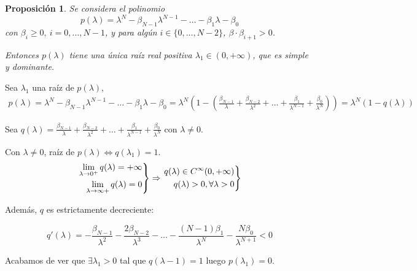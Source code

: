 \documentclass[11pt, a4paper]{article}
\makeatletter
\newif\IfInSansMode
\let\oldsf\sffamily
\renewcommand*{\sffamily}{\oldsf\mathversion{sans}\InSansModetrue}
\let\oldnorm\normalfont
\renewcommand*{\normalfont}{\oldnorm\InSansModefalse\mathversion{normal}}
\renewenvironment{proof}[1][\proofname] {\vspace{-15pt}\par\pushQED{\qed}\normalfont\topsep6\p@\@plus6\p@\relax\trivlist\item[\hskip\labelsep\it#1\@addpunct{.}]\ignorespaces}{\popQED\endtrivlist\@endpefalse}
\numberwithin{equation}{section}
\renewenvironment{proof}[1][\proofname] {\par\pushQED{\qed}\normalfont\topsep6\p@\@plus6\p@\relax\trivlist\item[\hskip\labelsep\itshape\sffamily#1\@addpunct{.}]\ignorespaces}{\popQED\endtrivlist\@endpefalse}
\theoremstyle{theorem-style}
\newtheorem{nprop}{Proposición}[section]
\theoremstyle{definition-style}
\theoremstyle{remark-style}
\theoremstyle{example-style}
\newenvironment{rcases}
  {\left.\begin{aligned}}
  {\end{aligned}\right\rbrace}
\makeatother
\begin{document}
     \begin{nprop}
        Se considera el polinomio $$p(\lambda) = \lambda^{N} - \beta_{N-1}\lambda^{N-1} - \hdots - \beta_1\lambda - \beta_0$$ con $\beta_i \geq 0, \ i = 0, \hdots, N -1$, y para algún $i \in \{ 0, \hdots, N -2 \}$, $\beta \cdot \beta_{i+1} > 0$.
        
        Entonces $p(\lambda)$ tiene una única raíz real positiva $\lambda_1 \in (0, +\infty)$, que es simple y dominante.
     \end{nprop}

     \begin{proof}
         Sea $\lambda_1$ una raíz de $p(\lambda)$, \begin{align*}
             \label{}
             p(\lambda) = \lambda^{N} - \beta_{N-1}\lambda^{N-1} - \hdots - \beta_1\lambda - \beta_0 = \lambda^{N}\left( 1 - \left( \frac{\beta_{N-1}}{\lambda} + \frac{\beta_{N-2}}{\lambda^2} + \hdots + \frac{\beta_{1}}{\lambda^{N-1}} + \frac{\beta_{0}}{\lambda^N}\right)\right) = \lambda^N(1 - q(\lambda))
         \end{align*}

         Sea $q(\lambda) = \frac{\beta_{N-1}}{\lambda} + \frac{\beta_{N-2}}{\lambda^2} + \hdots + \frac{\beta_{1}}{\lambda^{N-1}} + \frac{\beta_{0}}{\lambda^N}$ con $\lambda \neq 0$.

         Con $\lambda \neq 0$, raíz de $p(\lambda) \Leftrightarrow q(\lambda_1) = 1$.
        $$
         \begin{rcases}
             \lim_{\lambda \to 0^+} q(\lambda) = +\infty \\
            \lim_{\lambda \to \infty+} q(\lambda) = 0 \\
         \end{rcases} \Rightarrow \begin{rcases}
             q(\lambda) \in C^{\infty} (0, +\infty) \\
             q(\lambda )> 0, \forall \lambda > 0
         \end{rcases}$$

         Además, $q$ es estrictamente decreciente:

         $$q'(\lambda) = -\frac{\beta_{N-1}}{\lambda^2} -\frac{2\beta_{N-2}}{\lambda^3} - \hdots -\frac{(N-1)\beta_{1}}{\lambda^N} -\frac{N\beta_{0}}{\lambda^{N+1}} < 0$$


         Acabamos de ver que $\exists \lambda_1 > 0$ tal que $q(\lambda-1) = 1$ luego $p(\lambda_1) = 0$.


\end{proof}
\end{document}
